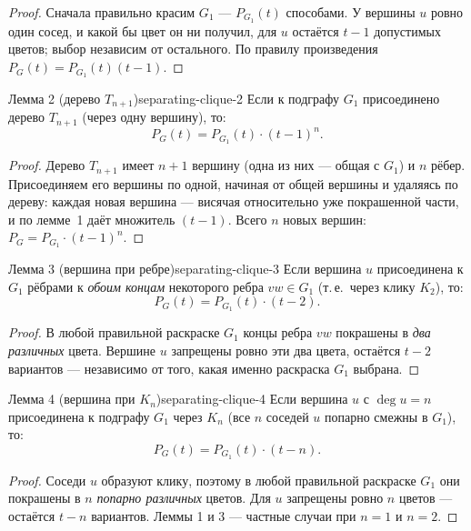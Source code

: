 \begin{proof}
Сначала правильно красим $G_1$ --- $P_{G_1}(t)$ способами. У вершины $u$
ровно один сосед, и какой бы цвет он ни получил, для $u$ остаётся
$t - 1$ допустимых цветов; выбор независим от остального. По правилу
произведения $P_G(t) = P_{G_1}(t)(t-1)$.
\end{proof}

\begin{lemma}{Лемма 2 (дерево $T_{n+1}$)}{separating-clique-2}
Если к подграфу $G_1$ присоединено дерево $T_{n+1}$ (через одну вершину), то:
\[
  P_G(t) = P_{G_1}(t) \cdot (t-1)^n.
\]
\end{lemma}

\begin{proof}
Дерево $T_{n+1}$ имеет $n + 1$ вершину (одна из них --- общая с $G_1$)
и $n$ рёбер. Присоединяем его вершины по одной, начиная от общей вершины
и удаляясь по дереву: каждая новая вершина --- висячая относительно уже
покрашенной части, и по лемме~1 даёт множитель $(t-1)$. Всего $n$ новых
вершин: $P_G = P_{G_1} \cdot (t-1)^n$.
\end{proof}

\begin{lemma}{Лемма 3 (вершина при ребре)}{separating-clique-3}
Если вершина $u$ присоединена к $G_1$ рёбрами к \emph{обоим концам}
некоторого ребра $vw \in G_1$ (т.\,е.\ через клику $K_2$), то:
\[
  P_G(t) = P_{G_1}(t) \cdot (t-2).
\]
\end{lemma}

\begin{proof}
В любой правильной раскраске $G_1$ концы ребра $vw$ покрашены в
\emph{два различных} цвета. Вершине $u$ запрещены ровно эти два цвета,
остаётся $t - 2$ вариантов --- независимо от того, какая именно
раскраска $G_1$ выбрана.
\end{proof}

\begin{lemma}{Лемма 4 (вершина при $K_n$)}{separating-clique-4}
Если вершина $u$ с $\deg u = n$ присоединена к подграфу $G_1$ через $K_n$
(все $n$ соседей $u$ попарно смежны в $G_1$), то:
\[
  P_G(t) = P_{G_1}(t) \cdot (t - n).
\]
\end{lemma}

\begin{proof}
Соседи $u$ образуют клику, поэтому в любой правильной раскраске $G_1$
они покрашены в $n$ \emph{попарно различных} цветов. Для $u$ запрещены
ровно $n$ цветов --- остаётся $t - n$ вариантов. Леммы 1 и 3 ---
частные случаи при $n = 1$ и $n = 2$.
\end{proof}

